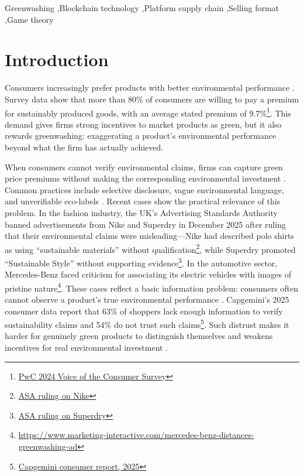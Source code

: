 \documentclass[preprint,review,12pt,authoryear,nopreprintline]{elsarticle}
\theoremstyle{definition}
\begin{document}
\begin{frontmatter}
\begin{keyword}
Greenwashing \sep Blockchain technology \sep Platform supply chain \sep Selling format \sep Game theory
\end{keyword}

\end{frontmatter}

\section{Introduction}\label{sec:1}

Consumers increasingly prefer products with better environmental performance \citep{Ye2024the}. Survey data show that more than 80\% of consumers are willing to pay a premium for sustainably produced goods, with an average stated premium of 9.7\%\footnote{\href{https://www.pwc.com/gx/en/news-room/press-releases/2024/pwc-2024-voice-of-consumer-survey.html}{PwC 2024 Voice of the Consumer Survey}}. This demand gives firms strong incentives to market products as green, but it also rewards greenwashing: exaggerating a product's environmental performance beyond what the firm has actually achieved.

When consumers cannot verify environmental claims, firms can capture green price premiums without making the corresponding environmental investment \citep{huang2020coml, wang2025go}. Common practices include selective disclosure, vague environmental language, and unverifiable eco-labels \citep{chen2023impact, xia2026bl}. Recent cases show the practical relevance of this problem. In the fashion industry, the UK's Advertising Standards Authority banned advertisements from Nike and Superdry in December 2025 after ruling that their environmental claims were misleading---Nike had described polo shirts as using ``sustainable materials'' without qualification\footnote{\href{https://www.asa.org.uk/rulings/nike-retail-bv-a25-1309100-nike-retail-bv.html}{ASA ruling on Nike}}, while Superdry promoted ``Sustainable Style'' without supporting evidence\footnote{\href{https://www.asa.org.uk/rulings/supergroup-internet-ltd-a25-1309101-supergroup-internet-ltd.html}{ASA ruling on Superdry}}. In the automotive sector, Mercedes-Benz faced criticism for associating its electric vehicles with images of pristine nature\footnote{\url{https://www.marketing-interactive.com/mercedes-benz-distances-greenwashing-ad}}. These cases reflect a basic information problem: consumers often cannot observe a product's true environmental performance \citep{dong2023log}. Capgemini's 2025 consumer data report that 63\% of shoppers lack enough information to verify sustainability claims and 54\% do not trust such claims\footnote{\href{https://www.capgemini.com/ca-en/insights/expert-perspectives/where-green-meets-growth-engaging-the-mainstream-middle-through-conscious-consumerism/}{Capgemini consumer report, 2025}}. Such distrust makes it harder for genuinely green products to distinguish themselves and weakens incentives for real environmental investment \citep{Gao2025esg}.
\end{document}

